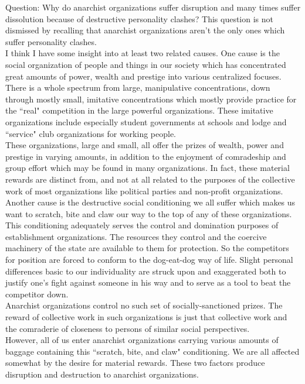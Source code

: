 \documentclass[12pt, onecolumn, letterpaper, oneside]{book}
\begin{document}
Question: Why do anarchist organizations suffer disruption and many times suffer dissolution because of destructive personality clashes? This question is not dismissed by recalling that anarchist organizations aren't the only ones which suffer personality clashes.\\
I think I have some insight into at least two related causes. One cause is the social organization of people and things in our society which has concentrated great amounts of power, wealth and prestige into various centralized focuses. There is a whole spectrum from large, manipulative concentrations, down through mostly small, imitative concentrations which mostly provide practice for the ``real" competition in the large powerful organizations. These imitative organizations include especially student governments at schools and lodge and ``service" club organizations for working people.\\
These organizations, large and small, all offer the prizes of wealth, power and prestige in varying amounts, in addition to the enjoyment of comradeship and group effort which may be found in many organizations. In fact, these material rewards are distinct from, and not at all related to the purposes of the collective work of most organizations like political parties and non-profit organizations.\\
Another cause is the destructive social conditioning we all suffer which makes us want to scratch, bite and claw our way to the top of any of these organizations. This conditioning adequately serves the control and domination purposes of establishment organizations. The resources they control and the coercive machinery of the state are available to them for protection. So the competitors for position are forced to conform to the dog-eat-dog way of life. Slight personal differences basic to our individuality are struck upon and exaggerated both to justify one's fight against someone in his way and to serve as a tool to beat the competitor down.\\
Anarchist organizations control no such set of socially-sanctioned prizes. The reward of collective work in such organizations is just that collective work and the comraderie of closeness to persons of similar social perspectives.\\
However, all of us enter anarchist organizations carrying various amounts of baggage containing this ``scratch, bite, and claw" conditioning. We are all affected somewhat by the desire for material rewards. These two factors produce disruption and destruction to anarchist organizations.\\
\end{document}
